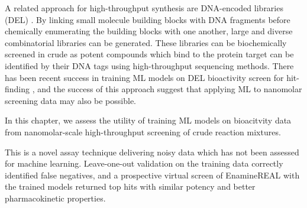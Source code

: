 A related approach for high-throughput synthesis are DNA-encoded libraries (DEL) \cite{GirondaMartinez2021DNALibrary}. By linking small molecule building blocks with DNA fragments before chemically enumerating the building blocks with one another, large and diverse combinatorial libraries can be generated. These libraries can be biochemically screened in crude as potent compounds which bind to the protein target can be identified by their DNA tags using high-throughput sequencing methods. There has been recent success in training ML models on DEL bioactivity screen for hit-finding \cite{McCloskey2020DNALibrary}, and the success of this approach suggest that applying ML to nanomolar screening data may also be possible.

In this chapter, we assess the utility of training ML models on bioacitvity data from nanomolar-scale high-throughput screening of crude reaction mixtures.

This is a novel assay technique delivering noisy data which has not been assessed for machine learning. Leave-one-out validation on the training data correctly identified false negatives, and a prospective virtual screen of EnamineREAL with the trained models returned top hits with similar potency and better pharmacokinetic properties.



